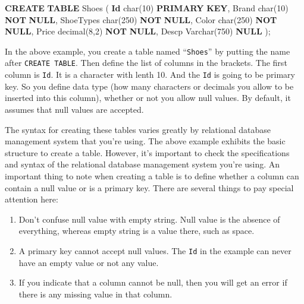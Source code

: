 \documentclass[]{book}
\makeatletter
\newenvironment{Shaded}{\begin{snugshade}}{\end{snugshade}}
\newcommand{\KeywordTok}[1]{\textcolor[rgb]{0.13,0.29,0.53}{\textbf{{#1}}}}
\newcommand{\DataTypeTok}[1]{\textcolor[rgb]{0.13,0.29,0.53}{{#1}}}
\newcommand{\DecValTok}[1]{\textcolor[rgb]{0.00,0.00,0.81}{{#1}}}
\newcommand{\NormalTok}[1]{{#1}}
\providecommand{\tightlist}{%
  \setlength{\itemsep}{0pt}\setlength{\parskip}{0pt}}
\newenvironment{kframe}{%
\medskip{}
\setlength{\fboxsep}{.8em}
 \def\at@end@of@kframe{}%
 \ifinner\ifhmode%
  \def\at@end@of@kframe{\end{minipage}}%
  \begin{minipage}{\columnwidth}%
 \fi\fi%
 \def\FrameCommand##1{\hskip\@totalleftmargin \hskip-\fboxsep
 \colorbox{shadecolor}{##1}\hskip-\fboxsep
     \hskip-\linewidth \hskip-\@totalleftmargin \hskip\columnwidth}%
 \MakeFramed {\advance\hsize-\width
   \@totalleftmargin\z@ \linewidth\hsize
   \@setminipage}}%
 {\par\unskip\endMakeFramed%
 \at@end@of@kframe}
\renewenvironment{Shaded}{\begin{kframe}}{\end{kframe}}
\theoremstyle{definition}
\theoremstyle{definition}
\theoremstyle{remark}
\makeatother
\begin{document}
\begin{Shaded}
\begin{Highlighting}[]
\KeywordTok{CREATE} \KeywordTok{TABLE} \NormalTok{Shoes}
\NormalTok{(}
\KeywordTok{Id}     \DataTypeTok{char}\NormalTok{(}\DecValTok{10}\NormalTok{)     }\KeywordTok{PRIMARY} \KeywordTok{KEY}\NormalTok{,}
\NormalTok{Brand  }\DataTypeTok{char}\NormalTok{(}\DecValTok{10}\NormalTok{)     }\KeywordTok{NOT} \KeywordTok{NULL}\NormalTok{,}
\NormalTok{ShoeTypes  }\DataTypeTok{char}\NormalTok{(}\DecValTok{250}\NormalTok{)    }\KeywordTok{NOT} \KeywordTok{NULL}\NormalTok{,}
\NormalTok{Color  }\DataTypeTok{char}\NormalTok{(}\DecValTok{250}\NormalTok{)    }\KeywordTok{NOT} \KeywordTok{NULL}\NormalTok{,}
\NormalTok{Price  }\DataTypeTok{decimal}\NormalTok{(}\DecValTok{8}\NormalTok{,}\DecValTok{2}\NormalTok{) }\KeywordTok{NOT} \KeywordTok{NULL}\NormalTok{,}
\NormalTok{Descp  }\DataTypeTok{Varchar}\NormalTok{(}\DecValTok{750}\NormalTok{) }\KeywordTok{NULL}
\NormalTok{);}
\end{Highlighting}
\end{Shaded}

In the above example, you create a table named ``\texttt{Shoes}'' by
putting the name after \texttt{CREATE\ TABLE}. Then define the list of
columns in the brackets. The first column is \texttt{Id}. It is a
character with lenth 10. And the \texttt{Id} is going to be primary key.
So you define data type (how many characters or decimals you allow to be
inserted into this column), whether or not you allow null values. By
default, it assumes that null values are accepted.

The syntax for creating these tables varies greatly by relational
database management system that you're using. The above example exhibits
the basic structure to create a table. However, it's important to check
the specifications and syntax of the relational database management
system you're using. An important thing to note when creating a table is
to define whether a column can contain a null value or is a primary key.
There are several things to pay special attention here:

\begin{enumerate}
\def\labelenumi{\arabic{enumi}.}
\tightlist
\item
  Don't confuse null value with empty string. Null value is the absence
  of everything, whereas empty string is a value there, such as space.
\item
  A primary key cannot accept null values. The \texttt{Id} in the
  example can never have an empty value or not any value.
\item
  If you indicate that a column cannot be null, then you will get an
  error if there is any missing value in that column.
\end{enumerate}
\end{document}

